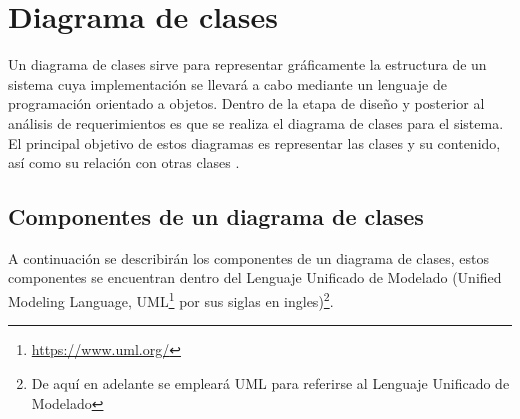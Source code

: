 \newpage
\section{Diagrama de clases}
Un diagrama de clases sirve para representar gráficamente la estructura de un sistema cuya implementación se llevará a cabo mediante un lenguaje de programación orientado a objetos. Dentro de la etapa de diseño y posterior al análisis de requerimientos es que se realiza el diagrama de clases para el sistema. El principal objetivo de estos diagramas es representar las clases y su contenido, así como su relación con otras clases \cite{clases}.

\subsection{Componentes de un diagrama de clases}
A continuación se describirán los componentes de un diagrama de clases, estos componentes se encuentran dentro del Lenguaje Unificado de Modelado (Unified Modeling Language, UML\footnote{\url{https://www.uml.org/}} por sus siglas en ingles)\footnote{De aquí en adelante se empleará UML para referirse al Lenguaje Unificado de Modelado}.

